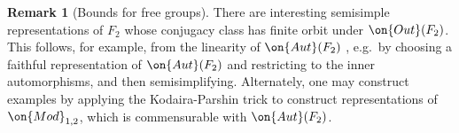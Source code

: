 \documentclass[12 pt]{amsart}
\theoremstyle{plain}
\theoremstyle{definition}
\newtheorem{remark}[subsubsection]{Remark}
\theoremstyle{remark}
\numberwithin{equation}{section}
\begin{document}
\begin{remark}[Bounds for free groups]
There are interesting semisimple representations of $F_2$ whose conjugacy class
has finite orbit under $\on{Out}(F_2)$. This follows, for example, from the linearity of $\on{Aut}(F_2)$ \cite{krammer2000braid}, e.g.~by choosing a faithful representation of $\on{Aut}(F_2)$ and restricting to the inner automorphisms, and then semisimplifying. Alternately, one may construct examples by applying the Kodaira-Parshin trick to construct representations of $\on{Mod}_{1,2}$, which is commensurable with $\on{Aut}(F_2)$.
\end{remark}
\end{document}
